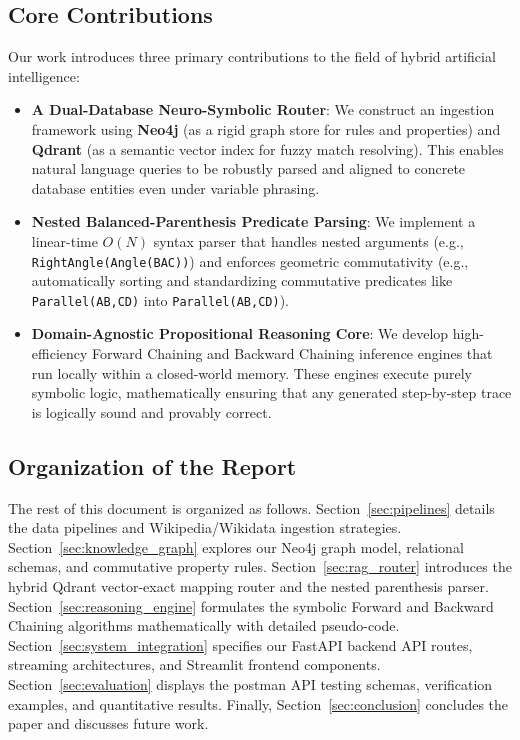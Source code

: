 \subsection{Core Contributions}
Our work introduces three primary contributions to the field of hybrid artificial intelligence:
\begin{itemize}
    \item \textbf{A Dual-Database Neuro-Symbolic Router}: We construct an ingestion framework using \textbf{Neo4j} (as a rigid graph store for rules and properties) and \textbf{Qdrant} (as a semantic vector index for fuzzy match resolving). This enables natural language queries to be robustly parsed and aligned to concrete database entities even under variable phrasing.
    \item \textbf{Nested Balanced-Parenthesis Predicate Parsing}: We implement a linear-time $O(N)$ syntax parser that handles nested arguments (e.g., \texttt{RightAngle(Angle(BAC))}) and enforces geometric commutativity (e.g., automatically sorting and standardizing commutative predicates like \texttt{Parallel(AB,CD)} into \texttt{Parallel(AB,CD)}).
    \item \textbf{Domain-Agnostic Propositional Reasoning Core}: We develop high-efficiency Forward Chaining and Backward Chaining inference engines that run locally within a closed-world memory. These engines execute purely symbolic logic, mathematically ensuring that any generated step-by-step trace is logically sound and provably correct.
\end{itemize}

\subsection{Organization of the Report}
The rest of this document is organized as follows. Section~\ref{sec:pipelines} details the data pipelines and Wikipedia/Wikidata ingestion strategies. Section~\ref{sec:knowledge_graph} explores our Neo4j graph model, relational schemas, and commutative property rules. Section~\ref{sec:rag_router} introduces the hybrid Qdrant vector-exact mapping router and the nested parenthesis parser. Section~\ref{sec:reasoning_engine} formulates the symbolic Forward and Backward Chaining algorithms mathematically with detailed pseudo-code. Section~\ref{sec:system_integration} specifies our FastAPI backend API routes, streaming architectures, and Streamlit frontend components. Section~\ref{sec:evaluation} displays the postman API testing schemas, verification examples, and quantitative results. Finally, Section~\ref{sec:conclusion} concludes the paper and discusses future work.
